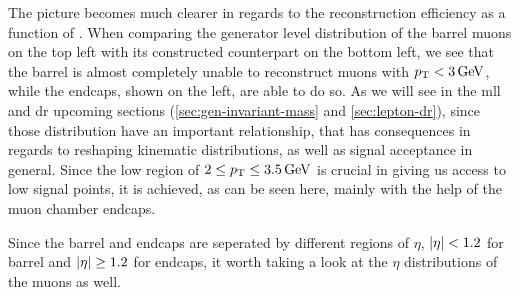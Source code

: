 The picture becomes much clearer in regards to the reconstruction efficiency as a function of \pt. When comparing the generator level distribution of the barrel muons on the top left with its constructed counterpart on the bottom left, we see that the barrel is almost completely unable to reconstruct muons with $p_{\mathrm{T}} < 3\,\text{Ge\hspace{-.08em}V}$, while the endcaps, shown on the left, are able to do so. As we will see in the \gls{mll} and \gls{dr} upcoming sections (\ref{sec:gen-invariant-mass} and \ref{sec:lepton-dr}), since those distribution have an important relationship, that has consequences in regards to reshaping kinematic distributions, as well as signal acceptance in general. Since the low region of $2 \leq p_{\mathrm{T}} \leq 3.5\,\text{Ge\hspace{-.08em}V}$ is crucial in giving us access to low \dm signal points, it is achieved, as can be seen here, mainly with the help of the muon chamber endcaps.

Since the barrel and endcaps are seperated by different regions of $\eta$, $\lvert \eta \rvert < 1.2$ for barrel and $\lvert \eta \rvert \geq 1.2$ for endcaps, it worth taking a look at the $\eta$ distributions of the muons as well.

